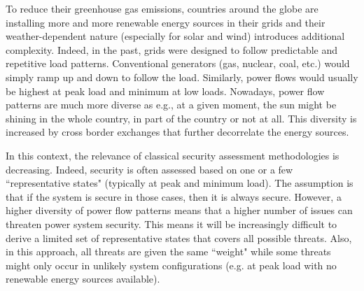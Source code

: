 To reduce their greenhouse gas emissions, countries around the globe are installing more and more renewable energy sources in their grids and their weather-dependent nature (especially for solar and wind) introduces additional complexity. Indeed, in the past, grids were designed to follow predictable and repetitive load patterns. Conventional generators (gas, nuclear, coal, etc.) would simply ramp up and down to follow the load. Similarly, power flows would usually be highest at peak load and minimum at low loads. 
Nowadays, power flow patterns are much more diverse as e.g., at a given moment, the sun might be shining in the whole country, in part of the country or not at all. This diversity is increased by cross border exchanges that further decorrelate the energy sources.

In this context, the relevance of classical security assessment methodologies is decreasing. Indeed, security is often assessed based on one or a few ``representative states" (typically at peak and minimum load).
The assumption is that if the system is secure in those cases, then it is always secure. However, a higher diversity of power flow patterns means that a higher number of issues can threaten power system security. This means it will be increasingly difficult to derive a limited set of representative states that covers all possible threats. Also, in this approach, all threats are given the same ``weight" while some threats might only occur in unlikely system configurations (e.g. at peak load with no renewable energy sources available).


